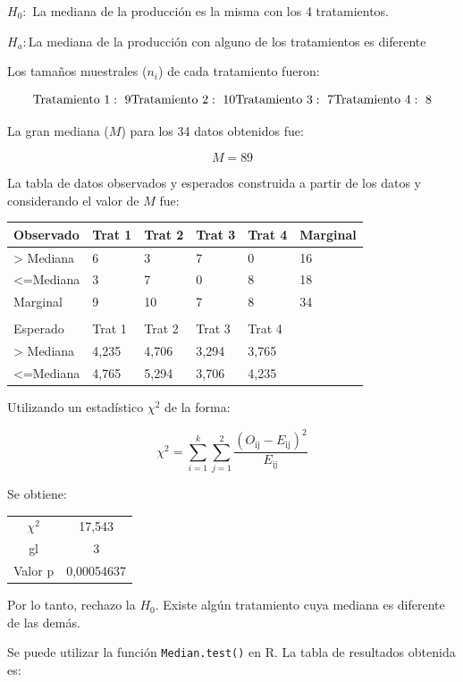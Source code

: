 \documentclass[]{book}
\theoremstyle{definition}
\theoremstyle{definition}
\theoremstyle{definition}
\theoremstyle{remark}
\begin{document}
\(H_{0}:\) La mediana de la producción es la misma con los 4
tratamientos.

\(H_{a}:\)La mediana de la producción con alguno de los tratamientos es
diferente

Los tamaños muestrales (\(n_{i}\)) de cada tratamiento fueron:

\[
\text{Tratamiento}\ 1:\ 9\\
\text{Tratamiento}\ 2:\ 10\\
\text{Tratamiento}\ 3:\ 7\\
\text{Tratamiento}\ 4:\ 8
\]

La gran mediana (\(M\)) para los 34 datos obtenidos fue:

\[
M = 89
\]

La tabla de datos observados y esperados construida a partir de los
datos y considerando el valor de \(M\) fue:

\begin{longtable}[]{@{}llllll@{}}
\toprule
Observado & Trat 1 & Trat 2 & Trat 3 & Trat 4 & Marginal\tabularnewline
\midrule
\endhead
\textgreater{} Mediana & 6 & 3 & 7 & 0 & 16\tabularnewline
\textless{}=Mediana & 3 & 7 & 0 & 8 & 18\tabularnewline
Marginal & 9 & 10 & 7 & 8 & 34\tabularnewline
& & & & &\tabularnewline
Esperado & Trat 1 & Trat 2 & Trat 3 & Trat 4 &\tabularnewline
\textgreater{} Mediana & 4,235 & 4,706 & 3,294 & 3,765 &\tabularnewline
\textless{}=Mediana & 4,765 & 5,294 & 3,706 & 4,235 &\tabularnewline
\bottomrule
\end{longtable}

Utilizando un estadístico \(\chi^{2}\) de la forma:

\[
\chi^{2} = \sum_{i = 1}^{k}{\sum_{j = 1}^{2}\frac{\left( O_{\text{ij}} - E_{\text{ij}} \right)^{2}}{E_{\text{ij}}}}
\]

Se obtiene:

\begin{longtable}[]{@{}cc@{}}
\toprule
\endhead
\(\chi^{2}\) & 17,543\tabularnewline
gl & 3\tabularnewline
Valor p & 0,00054637\tabularnewline
\bottomrule
\end{longtable}

Por lo tanto, rechazo la \(H_{0}\). Existe algún tratamiento cuya
mediana es diferente de las demás.

Se puede utilizar la función \texttt{Median.test()} en R. La tabla de
resultados obtenida es:
\end{document}
